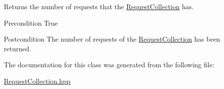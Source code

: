 Returns the number of requests that the \hyperlink{class_request_collection}{Request\-Collection} has. 

\begin{DoxyPrecond}{Precondition}
True 
\end{DoxyPrecond}
\begin{DoxyPostcond}{Postcondition}
The number of requests of the \hyperlink{class_request_collection}{Request\-Collection} has been returned. 
\end{DoxyPostcond}


The documentation for this class was generated from the following file\-:\begin{DoxyCompactItemize}
\item 
\hyperlink{_request_collection_8hpp}{Request\-Collection.\-hpp}\end{DoxyCompactItemize}
